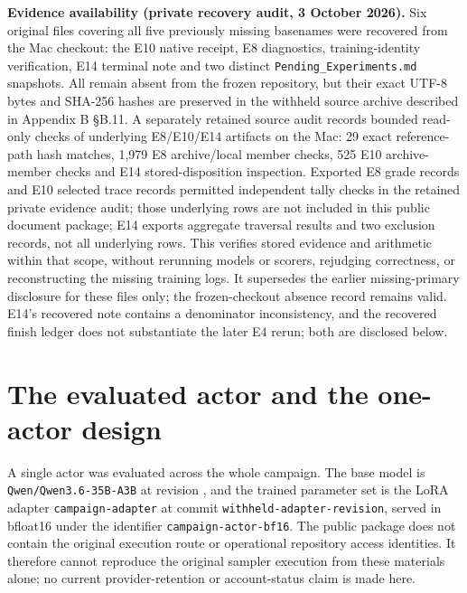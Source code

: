 \documentclass[12pt,a4paper]{report}
\DeclareRobustCommand{\longtok}[1]{\texttt{\seqsplit{#1}}}
\begin{document}
\textbf{Evidence availability (private recovery audit, 3 October 2026).}
Six original files covering all five previously missing basenames were
recovered from the Mac checkout: the E10 native receipt, E8 diagnostics,
training-identity verification, E14 terminal note and two distinct
\texttt{Pending\_Experiments.md} snapshots. All remain absent from the
frozen repository, but their exact UTF-8 bytes and SHA-256 hashes are
preserved in the withheld source archive described in Appendix B §B.11.
A separately retained source audit records bounded read-only checks of
underlying E8/E10/E14 artifacts on the Mac: 29 exact reference-path hash
matches, 1,979 E8 archive/local member checks, 525 E10 archive-member
checks and E14 stored-disposition inspection. Exported E8 grade records
and E10 selected trace records permitted independent tally checks in the
retained private evidence audit; those underlying rows are not included
in this public document package; E14 exports aggregate traversal results
and two exclusion records, not all underlying rows. This verifies stored
evidence and arithmetic within that scope, without rerunning models or
scorers, rejudging correctness, or reconstructing the missing training
logs. It supersedes the earlier missing-primary disclosure for these
files only; the frozen-checkout absence record remains valid. E14's
recovered note contains a denominator inconsistency, and the recovered
finish ledger does not substantiate the later E4 rerun; both are
disclosed below.

\section{The evaluated actor and the one-actor
design}\label{the-evaluated-actor-and-the-one-actor-design}

A single actor was evaluated across the whole campaign. The base model
is \texttt{Qwen/Qwen3.6-35B-A3B} at revision
\longtok{995ad96eacd98c81ed38be0c5b274b04031597b0}, and the trained
parameter set is the LoRA adapter \texttt{campaign-adapter} at commit
\texttt{withheld-adapter-revision}, served in bfloat16 under the
identifier \texttt{campaign-actor-bf16}. The public package does not
contain the original execution route or operational repository access
identities. It therefore cannot reproduce the original sampler execution
from these materials alone; no current provider-retention or
account-status claim is made here.
\end{document}
